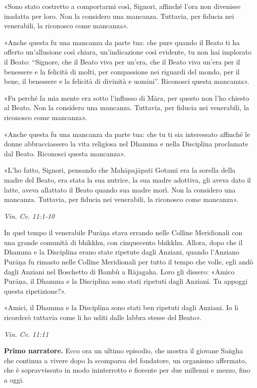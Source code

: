 «Sono stato costretto a comportarmi così, Signori, affinché l’ora non
divenisse inadatta per loro. Non la considero una mancanza. Tuttavia,
per fiducia nei venerabili, la riconosco come mancanza».


«Anche questa fu una mancanza da parte tua: che pure quando il Beato ti
ha offerto un’allusione così chiara, un’indicazione così evidente, tu
non hai implorato il Beato: “Signore, che il Beato viva per un’era, che
il Beato viva un’era per il benessere e la felicità di molti, per
compassione nei riguardi del mondo, per il bene, il benessere e la
felicità di divinità e uomini”. Riconosci questa mancanza».


«Fu perché la mia mente era sotto l’influsso di Māra, per questo non
l’ho chiesto al Beato. Non la considero una mancanza. Tuttavia, per
fiducia nei venerabili, la riconosco come mancanza».


«Anche questa fu una mancanza da parte tua: che tu ti sia interessato
affinché le donne abbracciassero la vita religiosa nel Dhamma e nella
Disciplina proclamate dal Beato. Riconosci questa mancanza».


«L’ho fatto, Signori, pensando che Mahāpajāpatī Gotamī era la sorella
della madre del Beato, era stata la sua nutrice, la sua madre adottiva,
gli aveva dato il latte, aveva allattato il Beato quando sua madre morì.
Non la considero una mancanza. Tuttavia, per fiducia nei venerabili, la
riconosco come mancanza».


\emph{Vin. Cv. 11:1-10}


In quel tempo il venerabile Purāṇa stava errando nelle Colline
Meridionali con una grande comunità di bhikkhu, con cinquecento bhikkhu.
Allora, dopo che il Dhamma e la Disciplina erano state ripetute dagli
Anziani, quando l’Anziano Purāṇa fu rimasto nelle Colline Meridionali
per tutto il tempo che volle, egli andò dagli Anziani nel Boschetto di
Bambù a Rājagaha. Loro gli dissero: «Amico Purāṇa, il Dhamma e la
Disciplina sono stati ripetuti dagli Anziani. Tu appoggi questa
ripetizione?».


«Amici, il Dhamma e la Disciplina sono stati ben ripetuti dagli Anziani.
Io li ricorderò tuttavia come li ho uditi dalle labbra stesse del
Beato».


\emph{Vin. Cv. 11:11}


\textbf{Primo narratore.} Ecco ora un ultimo episodio, che mostra il giovane
Saṅgha che continua a vivere dopo la scomparsa del fondatore, un
organismo affermato, che è sopravvissuto in modo ininterrotto e fiorente
per due millenni e mezzo, fino a oggi.


